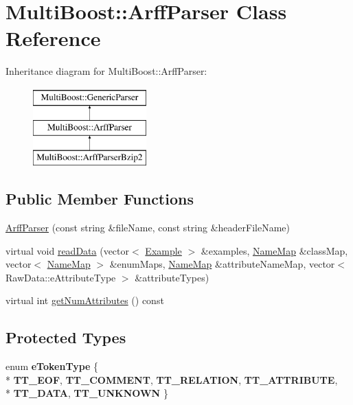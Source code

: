 \hypertarget{classMultiBoost_1_1ArffParser}{\section{Multi\-Boost\-:\-:Arff\-Parser Class Reference}
\label{classMultiBoost_1_1ArffParser}
}
Inheritance diagram for Multi\-Boost\-:\-:Arff\-Parser\-:\begin{figure}[H]
\begin{center}
\leavevmode
\includegraphics[height=3.000000cm]{classMultiBoost_1_1ArffParser}
\end{center}
\end{figure}
\subsection*{Public Member Functions}
\begin{DoxyCompactItemize}
\item 
\hyperlink{classMultiBoost_1_1ArffParser_a0662914fbd497ca015a9f1b4d89b6cd0}{Arff\-Parser} (const string \&file\-Name, const string \&header\-File\-Name)
\item 
virtual void \hyperlink{classMultiBoost_1_1ArffParser_a1ede5df98cbce136f1e554dbaf974a4f}{read\-Data} (vector$<$ \hyperlink{classMultiBoost_1_1Example}{Example} $>$ \&examples, \hyperlink{classMultiBoost_1_1NameMap}{Name\-Map} \&class\-Map, vector$<$ \hyperlink{classMultiBoost_1_1NameMap}{Name\-Map} $>$ \&enum\-Maps, \hyperlink{classMultiBoost_1_1NameMap}{Name\-Map} \&attribute\-Name\-Map, vector$<$ Raw\-Data\-::e\-Attribute\-Type $>$ \&attribute\-Types)
\item 
virtual int \hyperlink{classMultiBoost_1_1ArffParser_aa2921ea554b3b8fd14aa893d7ab0eedd}{get\-Num\-Attributes} () const 
\end{DoxyCompactItemize}
\subsection*{Protected Types}
\begin{DoxyCompactItemize}
\item 
enum {\bfseries e\-Token\-Type} \{ \\*
{\bfseries T\-T\-\_\-\-E\-O\-F}, 
{\bfseries T\-T\-\_\-\-C\-O\-M\-M\-E\-N\-T}, 
{\bfseries T\-T\-\_\-\-R\-E\-L\-A\-T\-I\-O\-N}, 
{\bfseries T\-T\-\_\-\-A\-T\-T\-R\-I\-B\-U\-T\-E}, 
\\*
{\bfseries T\-T\-\_\-\-D\-A\-T\-A}, 
{\bfseries T\-T\-\_\-\-U\-N\-K\-N\-O\-W\-N}
 \}
\end{DoxyCompactItemize}

